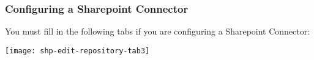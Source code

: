 %
%

\subsubsection{Configuring a Sharepoint Connector}

You must fill in the following tabs if you are configuring a
Sharepoint Connector:

\texttt{[image: shp-edit-repository-tab3]}

